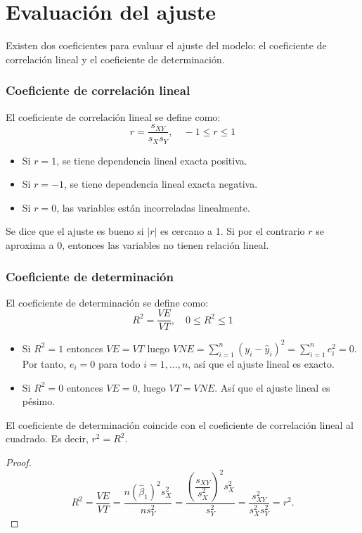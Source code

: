 \section{Evaluación del ajuste}
Existen dos coeficientes para evaluar el ajuste del modelo: el coeficiente de correlación lineal y el coeficiente de determinación.

\subsubsection{Coeficiente de correlación lineal}
El coeficiente de correlación lineal se define como:
$$r = \frac{s_{XY}}{s_X s_Y}, \quad -1 \leq r \leq 1$$
\begin{itemize}
    \item Si $r = 1$, se tiene dependencia lineal exacta positiva.
    \item Si $r = -1$, se tiene dependencia lineal exacta negativa.
    \item Si $r = 0$, las variables están incorreladas linealmente.
\end{itemize}
Se dice que el ajuste es bueno si $|r|$ es cercano a 1.
Si por el contrario $r$ se aproxima a 0, entonces las variables no tienen relación lineal.

\subsubsection{Coeficiente de determinación}
El coeficiente de determinación se define como:
$$R^2 = \frac{VE}{VT}, \quad 0 \leq R^2 \leq 1$$
\begin{itemize}
    \item Si $R^2 = 1$ entonces $VE = VT$ luego $VNE = \sum_{i=1}^n (y_i - \widehat{y}_i)^2 = \sum_{i=1}^n e_i^2 = 0$.
          Por tanto, $e_i = 0$ para todo $i = 1, \dots, n$, así que el ajuste lineal es exacto.
    \item Si $R^2 = 0$ entonces $VE = 0$, luego $VT = VNE$.
          Así que el ajuste lineal es pésimo.
\end{itemize}

\begin{teo}
    El coeficiente de determinación coincide con el coeficiente de correlación lineal al cuadrado. Es decir, $r^2 = R^2$.
\end{teo}

\begin{proof}
    $$R^2 = \frac{VE}{VT} = \frac{n(\widehat{\beta}_1)^2s_X^2}{ns_Y^2} = \frac{\left(\dfrac{s_{XY}}{s_X^2}\right)^2 s_X^2}{s_Y^2} = \frac{s_{XY}^2}{s_X^2 s_Y^2} = r^2.$$
\end{proof}

